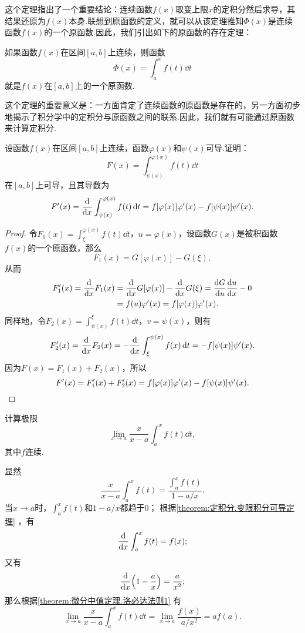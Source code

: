 这个定理指出了一个重要结论：连续函数\(f(x)\)取变上限\(x\)的定积分然后求导，其结果还原为\(f(x)\)本身.联想到原函数的定义，就可以从该定理推知\(\Phi(x)\)是连续函数\(f(x)\)的一个原函数.因此，我们引出如下的原函数的存在定理：

\begin{theorem}[原函数存在定理]\label{theorem:定积分.原函数存在定理}
如果函数\(f(x)\)在区间\([a,b]\)上连续，则函数\[
\Phi(x) = \int_a^x f(t) \dd{t}
\]就是\(f(x)\)在\([a,b]\)上的一个原函数.
\end{theorem}
这个定理的重要意义是：一方面肯定了连续函数的原函数是存在的，另一方面初步地揭示了积分学中的定积分与原函数之间的联系.因此，我们就有可能通过原函数来计算定积分.

\begin{example}
设函数\(f(x)\)在区间\([a,b]\)上连续，函数\(\varphi(x)\)和\(\psi(x)\)可导.证明：\[
F(x) = \int_{\psi(x)}^{\varphi(x)} f(t) \dd{t}
\]在\([a,b]\)上可导，且其导数为\begin{equation}\label{equation:定积分.含参变量积分的导数1}
F'(x) = \dv{x} \int_{\psi(x)}^{\varphi(x)} f(t) \dd{t}
= f[\varphi(x)] \varphi'(x) - f[\psi(x)] \psi'(x).
\end{equation}
\begin{proof}
令\(F_1(x) = \int_{\xi}^{\varphi(x)} f(t) \dd{t}\)，\(u = \varphi(x)\)，设函数\(G(x)\)是被积函数\(f(x)\)的一个原函数，那么\[
F_1(x) = G[\varphi(x)] - G(\xi),
\]从而\begin{align*}
F'_1(x) = \dv{x} F_1(x)
&= \dv{x} G[\varphi(x)] - \dv{x} G(\xi) = \dv{G}{u} \dv{u}{x} - 0 \\
&= f(u) \varphi'(x) = f[\varphi(x)] \varphi'(x).
\end{align*}
同样地，令\(F_2(x) = \int_{\psi(x)}^{\xi} f(t) \dd{t}\)，\(v = \psi(x)\)，则有\[
F'_2(x) = \dv{x} F_2(x) = -\dv{x} \int_{\xi}^{\psi(x)} f(x) \dd{t}
= -f[\psi(x)] \psi'(x).
\]
因为\(F(x) = F_1(x) + F_2(x)\)，所以\[
F'(x) = F'_1(x) + F'_2(x)
= f[\varphi(x)] \varphi'(x) - f[\psi(x)] \psi'(x).
\qedhere
\]
\end{proof}
\end{example}

\begin{example}
计算极限\[
\lim\limits_{x \to a} \frac{x}{x-a} \int_a^x f(t) \dd{t},
\]其中\(f\)连续.
\begin{solution}
显然\[
\frac{x}{x-a} \int_a^x f(t)
= \frac{\int_a^x f(t)}{1 - a/x}.
\]
当\(x \to a\)时，\(\int_a^x f(t)\)和\(1 - a/x\)都趋于0；
根据\cref{theorem:定积分.变限积分可导定理} ，有\[
\dv{x} \int_a^x f(t) = f(x);
\]又有\[
\dv{x}(1 - \frac{a}{x}) = \frac{a}{x^2};
\]那么根据\cref{theorem:微分中值定理.洛必达法则1} 有\[
\lim\limits_{x \to a} \frac{x}{x-a} \int_a^x f(t) \dd{t}
= \lim\limits_{x \to a} \frac{f(x)}{a/x^2}
= a f(a).
\]
\end{solution}
\end{example}


